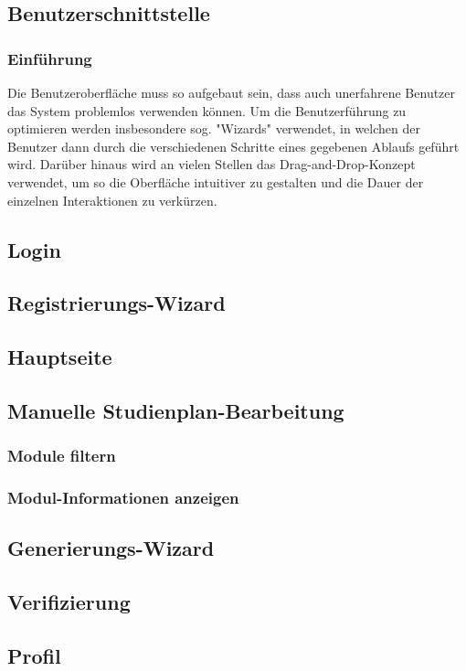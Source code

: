 \subsection{Benutzerschnittstelle}

\subsubsection{Einführung}
Die Benutzeroberfläche muss so aufgebaut sein, dass auch unerfahrene Benutzer das System problemlos verwenden können.
Um die Benutzerführung zu optimieren werden insbesondere sog. "Wizards" verwendet, in welchen der Benutzer dann durch die verschiedenen Schritte eines gegebenen Ablaufs geführt wird. Darüber hinaus wird an vielen Stellen das Drag-and-Drop-Konzept verwendet, um so die Oberfläche intuitiver zu gestalten und die Dauer der einzelnen Interaktionen zu verkürzen.

\subsection{Login}

\subsection{Registrierungs-Wizard}

\subsection{Hauptseite}

\subsection{Manuelle Studienplan-Bearbeitung}
\subsubsection{Module filtern}

\subsubsection{Modul-Informationen anzeigen}



\subsection{Generierungs-Wizard}

\subsection{Verifizierung}

\subsection{Profil}